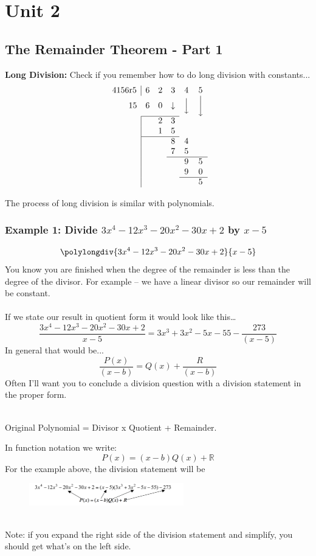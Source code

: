\documentclass{article}
\begin{document}
\section{Unit 2}

\subsection{The Remainder Theorem - Part 1}
\textbf{Long Division:}
Check if you remember how to do long division with constants...
\[
\begin{array}{c|ccccc}
4156 \text{r} 5 & 6 & 2 & 3 & 4 & 5 \\
\multicolumn{1}{r}{15} & 6 & 0 & \downarrow & \Big\downarrow & \bigg\downarrow \\
\cline{2-4}
 &  & 2 & 3 &  \\
 & & 1 & 5 &  \\
\cline{2-4}
 &  &  & 8 & 4 \\
 &  & & 7 & 5\\
\cline{4-6}
 &  &  &  & 9 & 5 \\
 &  &  &  & 9 & 0 \\
\cline{5-6}
 &  &  &  & & 5 \\
\end{array}
\]



The process of long division is similar with polynomials.
\subsubsection*{Example 1: Divide $3x^4-12x^3-20x^2-30x+2$ by $x-5$}

$$\polylongdiv{3x^4-12x^3-20x^2-30x+2}{x-5}$$
You know you are finished when the degree of the remainder is less than the
degree of the divisor. For example – we have a linear divisor so our remainder
will be constant. \\ \\ 
If we state our result in quotient form it would look like this…
$$\frac{3x^4-12x^3-20x^2-30x+2}{x-5}=3x^3+3x^2-5x-55-\frac{273}{(x-5)}$$
In general that would be...
$$\frac{P(x)}{(x-b)}=Q(x)+\frac{R}{(x-b)}$$
\newpage
Often I’ll want you to conclude a division question with a division statement
in the proper form.\\\\
\begin{center}
Original Polynomial = Divisor x Quotient + Remainder.
\end{center}
In function notation we write:
$$P(x)=(x-b)Q(x)+\mathbb{R}$$
For the example above, the division statement will be
\begin{figure}[h]
    \centering
    \includegraphics[width=0.6\textwidth]{imgs/division statement.png}
\end{figure}\\
Note: if you expand the right side of the division statement and simplify, you
should get what’s on the left side.
\end{document}

